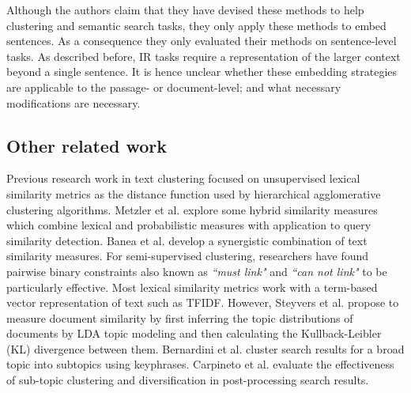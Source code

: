Although the authors claim that they have devised these methods to help clustering and semantic search tasks, they only apply these methods to embed sentences. As a consequence they  only evaluated their methods on sentence-level tasks. As described before, IR tasks require a representation of the larger context beyond a single sentence. It is hence unclear whether these embedding strategies are applicable to the  passage- or document-level;  and what necessary modifications are necessary.

\subsection{Other related work} Previous research work in text clustering\cite{kulis2009semi,bilenko2004integrating,davidson2008finding,basu2004probabilistic,basu2002semi,gomaa2013survey} focused on unsupervised lexical similarity metrics as the distance function used by hierarchical agglomerative clustering algorithms. Metzler et al.\cite{metzler2007similarity} explore some hybrid similarity measures which combine lexical and probabilistic measures with application to query similarity detection. Banea et al.\cite{banea2012unt} develop a synergistic combination of text similarity measures. For semi-supervised clustering, researchers have found pairwise binary constraints also known as \textit{``must link"} and \textit{``can not link"} to be particularly effective. Most lexical similarity metrics work with a term-based vector representation of text such as TFIDF. However, Steyvers et al.\cite{steyvers2007probabilistic} propose to measure document similarity by first inferring the topic distributions of documents by LDA\cite{blei2003latent} topic modeling and then calculating the Kullback-Leibler (KL) divergence between them. Bernardini et al. \cite{bernardini2009full} cluster search results for a broad topic into subtopics using keyphrases. Carpineto et al. \cite{carpineto2012evaluating} evaluate the effectiveness of sub-topic clustering and diversification in post-processing search results.

